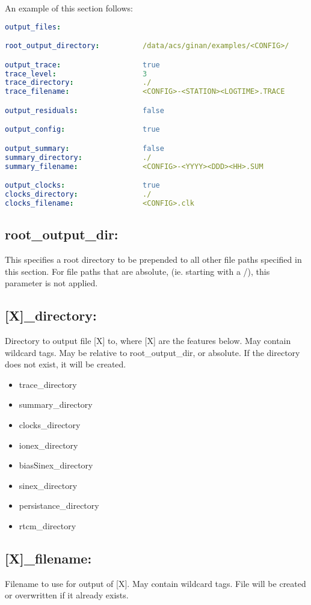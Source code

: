 An example of this section follows:
\begin{lstlisting}[language=yaml,caption=output\_files:]
output_files:

root_output_directory:          /data/acs/ginan/examples/<CONFIG>/

output_trace:                   true
trace_level:                    3
trace_directory:                ./
trace_filename:                 <CONFIG>-<STATION><LOGTIME>.TRACE

output_residuals:               false

output_config:                  true

output_summary:                 false
summary_directory:              ./
summary_filename:               <CONFIG>-<YYYY><DDD><HH>.SUM

output_clocks:                  true
clocks_directory:               ./
clocks_filename:                <CONFIG>.clk
\end{lstlisting}

\subsection*{root\_output\_dir:}
This specifies a root directory to be prepended to all other file paths specified in this section. For file paths that are absolute, (ie. starting with a /), this parameter is not applied.

\subsection*{[X]\_directory:}
Directory to output file [X] to, where [X] are the features below. May contain wildcard tags. May be relative to root\_output\_dir, or absolute. If the directory does not exist, it will be created.

\begin{itemize}
\item trace\_directory
\item summary\_directory
\item clocks\_directory
\item ionex\_directory
\item biasSinex\_directory
\item sinex\_directory
\item persistance\_directory
\item rtcm\_directory
\end{itemize}

\subsection*{[X]\_filename:}
Filename to use for output of [X]. May contain wildcard tags. File will be created or overwritten if it already exists.

